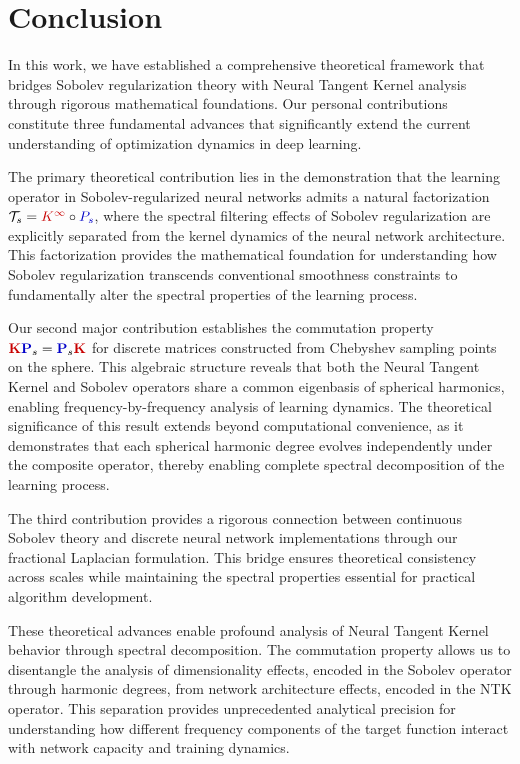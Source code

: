 \documentclass[a4paper]{article}
\newcommand{\Kop}{\textcolor{kernelcolor}{\mathbf{K}}}
\newcommand{\Pop}{\textcolor{sobolevcolor}{\mathbf{P}}}
\newcommand{\Kinf}{\textcolor{kernelcolor}{K^{\infty}}}
\newcommand{\Ps}{\textcolor{sobolevcolor}{P_s}}
\newcommand{\Ts}{\mathcal{T}_s}
\theoremstyle{plain}
\theoremstyle{definition}
\theoremstyle{remark}
\begin{document}
\newpage
\section*{Conclusion}
In this work, we have established a comprehensive theoretical framework that bridges Sobolev regularization theory with Neural Tangent Kernel analysis through rigorous mathematical foundations. Our personal contributions constitute three fundamental advances that significantly extend the current understanding of optimization dynamics in deep learning.

The primary theoretical contribution lies in the demonstration that the learning operator in Sobolev-regularized neural networks admits a natural factorization $\Ts = \Kinf \circ \Ps$, where the spectral filtering effects of Sobolev regularization are explicitly separated from the kernel dynamics of the neural network architecture. This factorization provides the mathematical foundation for understanding how Sobolev regularization transcends conventional smoothness constraints to fundamentally alter the spectral properties of the learning process.

Our second major contribution establishes the commutation property $\Kop \Pop_s = \Pop_s \Kop$ for discrete matrices constructed from Chebyshev sampling points on the sphere. This algebraic structure reveals that both the Neural Tangent Kernel and Sobolev operators share a common eigenbasis of spherical harmonics, enabling frequency-by-frequency analysis of learning dynamics. The theoretical significance of this result extends beyond computational convenience, as it demonstrates that each spherical harmonic degree evolves independently under the composite operator, thereby enabling complete spectral decomposition of the learning process.

The third contribution provides a rigorous connection between continuous Sobolev theory and discrete neural network implementations through our fractional Laplacian formulation. This bridge ensures theoretical consistency across scales while maintaining the spectral properties essential for practical algorithm development.

These theoretical advances enable profound analysis of Neural Tangent Kernel behavior through spectral decomposition. The commutation property allows us to disentangle the analysis of dimensionality effects, encoded in the Sobolev operator through harmonic degrees, from network architecture effects, encoded in the NTK operator. This separation provides unprecedented analytical precision for understanding how different frequency components of the target function interact with network capacity and training dynamics.
\end{document}
